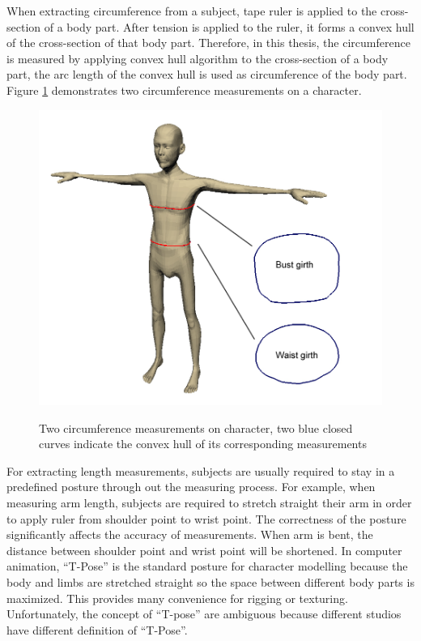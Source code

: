 When extracting circumference from a subject, tape ruler is applied to the cross-section of a body part. After tension is applied to the ruler, it forms a convex hull of the cross-section of that body part. Therefore, in this thesis, the circumference is measured by applying convex hull algorithm to the cross-section of a body part, the arc length of the convex hull is used as circumference of the body part. Figure \ref{figure:character_circumference} demonstrates two circumference measurements on a character.

\begin{figure}[H]
	\includegraphics[width=\columnwidth]{../images/character_circumference}\\[0.1cm]
    \caption[Two circumference measurements on character]{Two circumference measurements on character, two blue closed curves indicate the convex hull of its corresponding measurements}
    \label{figure:character_circumference}
\end{figure}


For extracting length measurements, subjects are usually required to stay in a predefined posture through out the measuring process. For example, when measuring arm length, subjects are required to stretch straight their arm in order to apply ruler from shoulder point to wrist point. The correctness of the posture significantly affects the accuracy of measurements. When arm is bent, the distance between shoulder point and wrist point will be shortened. In computer animation, ``T-Pose'' is the standard posture for character modelling because the body and limbs are stretched straight so the space between different body parts is maximized. This provides many convenience for rigging or texturing. Unfortunately, the concept of ``T-pose'' are ambiguous because different studios have different definition of ``T-Pose''. 

